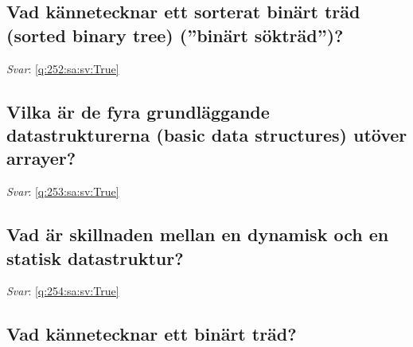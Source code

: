 \documentclass[a4paper,11pt,oneside]{article}
\begin{document}
\begin{sloppypar}
\subsection{Vad k\"annetecknar ett sorterat bin\"art tr\"ad (sorted binary tree) ({\textquotedblright}bin\"art s\"oktr\"ad{\textquotedblright})?}

\label{q:252:sa:sv:False}

\vspace{2cm}

\noindent\makebox[\textwidth]{\hrulefill}

\vspace{1cm}

\textit{Svar}: \autoref{q:252:sa:sv:True}



\subsection{Vilka \"ar de fyra grundl\"aggande datastrukturerna (basic data structures) ut\"over arrayer?}

\label{q:253:sa:sv:False}

\vspace{2cm}

\noindent\makebox[\textwidth]{\hrulefill}

\vspace{1cm}

\textit{Svar}: \autoref{q:253:sa:sv:True}



\subsection{Vad \"ar skillnaden mellan en dynamisk och en statisk datastruktur?}

\label{q:254:sa:sv:False}

\vspace{2cm}

\noindent\makebox[\textwidth]{\hrulefill}

\vspace{1cm}

\textit{Svar}: \autoref{q:254:sa:sv:True}



\subsection{Vad k\"annetecknar ett bin\"art tr\"ad?}

\label{q:255:sa:sv:False}


\end{sloppypar}
\end{document}
